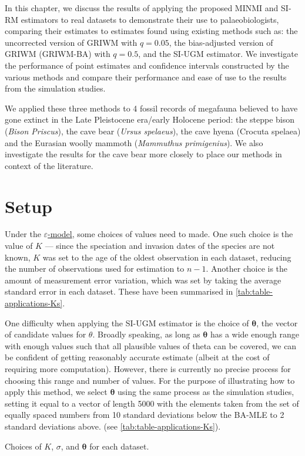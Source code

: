
In this chapter, we discuss the results of applying the proposed MINMI and SI-RM estimators to real datasets to demonstrate their use to palaeobiologists, comparing their estimates to estimates found using existing methods such as: the uncorrected version of GRIWM with $q=0.05$, the bias-adjusted version of GRIWM (GRIWM-BA) with $q=0.5$, and the SI-UGM estimator. We investigate the performance of point estimates and confidence intervals constructed by the various methods and compare their performance and ease of use to the results from the simulation studies.

We applied these three methods to 4 fossil records of megafauna believed to have gone extinct in the Late Pleistocene era/early Holocene period: the steppe bison (\textit{Bison Priscus}), the cave bear (\textit{Ursus spelaeus}), the cave hyena (Crocuta spelaea) and the Eurasian woolly mammoth (\textit{Mammuthus primigenius}). We also investigate the results for the cave bear more closely to place our methods in context of the literature.

\section{Setup}

Under the \hyperref[model: measurement-error]{$\varepsilon$-model}, some choices of values need to made. One such choice is the value of $K$ --- since the speciation and invasion dates of the species are not known, $K$ was set to the age of the oldest observation in each dataset, reducing the number of observations used for estimation to $n-1$. Another choice is the amount of measurement error variation, which was set by taking the average standard error in each dataset. These have been summarised in \autoref{tab:table-applications-Ks}.

One difficulty when applying the SI-UGM estimator is the choice of $\bm{\theta}$, the vector of candidate values for $\theta$. Broadly speaking, as long as $\bm{\theta}$ has a wide enough range with enough values such that all plausible values of theta can be covered, we can be confident of getting reasonably accurate estimate (albeit at the cost of requiring more computation). However, there is currently no precise process for choosing this range and number of values. For the purpose of illustrating how to apply this method, we select $\bm{\theta}$ using the same process as the simulation studies, setting it equal to a vector of length 5000 with the elements taken from the set of equally spaced numbers from 10 standard deviations below the BA-MLE to 2 standard deviations above. (see \autoref{tab:table-applications-Ks}).
\begin{table}[ht]
    \centering
    \vspace{-6mm}
    \caption{Choices of $K$, $\sigma$, and $\bm{\theta}$ for each dataset.}
    
    \label{tab:table-applications-Ks}
    \vspace{-4mm}
\end{table}

